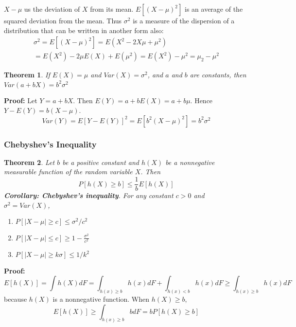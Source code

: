\documentclass{article}
\newtheorem{theorem}{Theorem}[section]
\begin{document}
\(X-\mu\) us the deviation of \(X\) from its mean. \(E[(X-\mu)^2]\) is an average of the squared deviation from the mean. Thus \(\sigma^2\) is a measure of the dispersion of a distribution that can be written in another form also:
\begin{equation*}
    \begin{split}
        \sigma^2 = E[(X-\mu)^2] = E(X^2-2X\mu+\mu^2) \\
        = E(X^2)-2\mu E(X)+E(\mu^2) = E(X^2)-\mu^2 = \mu_2 - \mu^2
    \end{split}
\end{equation*}

\begin{theorem}
    If \(E(X)=\mu\) and \(Var(X)=\sigma^2\), and \(a\) and \(b\) are constants, then \(Var(a+bX)=b^2\sigma^2\)
\end{theorem}

\textbf{Proof:} Let \(Y=a+bX\). Then \(E(Y)=a+b E(X) = a + b\mu\). Hence \(Y-E(Y)=b(X-\mu)\).
\begin{equation*}
    Var(Y)=E[Y-E(Y)]^2=E[b^2(X-\mu)^2]=b^2\sigma^2
\end{equation*}

\subsubsection{Chebyshev's Inequality}
\begin{theorem}
    Let \(b\) be a positive constant and \(h(X)\) be a nonnegative measurable function of the random variable \(X\). Then
    \begin{equation*}
        P[h(X) \geq b] \leq \frac{1}{b} E[h(X)]
    \end{equation*}
    \textbf{Corollary: Chebyshev's inequality}. For any constant \(c>0\) and \(\sigma^2=Var(X)\),
    \begin{enumerate}
        \item \(P[|X-\mu| \geq c] \leq \sigma^2/c^2\)
        \item \(P[|X-\mu| \leq c] \geq 1-\frac{\sigma^2}{c^2}\)
        \item \(P[|X-\mu| \geq k\sigma] \leq 1/k^2\)
    \end{enumerate}
\end{theorem}

\textbf{Proof:} \begin{equation*}
    E [h(X)] = \int h(X) dF = \int_{h(x) \geq b} h(x) dF + \int_{h(x)<b} h(x) dF \geq \int_{h(x) \geq b} h(x) dF
\end{equation*}
because \(h(X)\) is a nonnegative function. When \(h(X) \geq b\),
\begin{equation*}
    E[h(X)] \geq \int_{h(x) \geq b} b  dF = b P[h(X) \geq b] 
\end{equation*}
\end{document}
